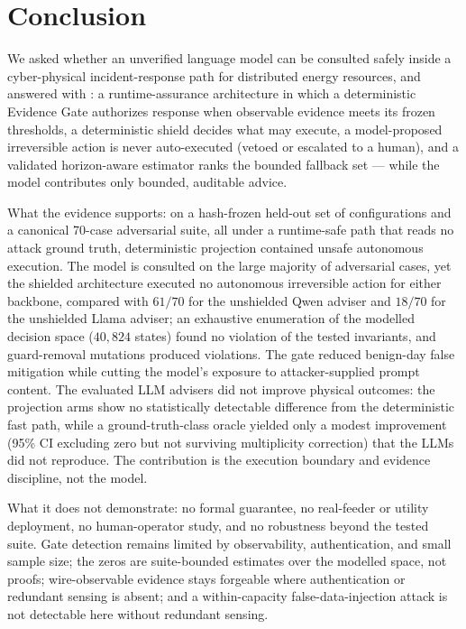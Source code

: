 \section{Conclusion}
\label{sec:conclusion}
We asked whether an unverified language model can be consulted safely
inside a cyber-physical incident-response path for distributed energy
resources, and answered with \ours: a runtime-assurance architecture in
which a deterministic Evidence Gate authorizes response when observable
evidence meets its frozen thresholds, a deterministic shield decides what may
execute, a model-proposed irreversible action is never auto-executed (vetoed
or escalated to a human), and a
validated horizon-aware estimator ranks the bounded fallback set --- while the
model contributes only bounded, auditable advice.

What the evidence supports: on a hash-frozen held-out set of configurations and a
canonical 70-case adversarial suite, all under a runtime-safe path that reads no
attack ground truth, deterministic projection contained unsafe autonomous
execution. The model is consulted on the large majority of adversarial cases, yet
the shielded architecture executed no autonomous irreversible action for either
backbone, compared with $61/70$ for the unshielded Qwen adviser and $18/70$ for
the unshielded Llama adviser; an exhaustive enumeration of the modelled decision
space ($40{,}824$ states) found no violation of the tested invariants, and
guard-removal mutations produced violations. The gate reduced benign-day false
mitigation while cutting the model's exposure to attacker-supplied prompt
content. The evaluated LLM advisers did not improve physical outcomes: the
projection arms show no statistically detectable difference from the
deterministic fast path, while a ground-truth-class oracle yielded only a modest
improvement (95\% CI excluding zero but not surviving multiplicity correction)
that the LLMs did not reproduce. The contribution is the execution boundary and
evidence discipline, not the model.

What it does not demonstrate: no formal guarantee, no real-feeder or utility
deployment, no human-operator study, and no robustness beyond the tested suite.
Gate detection remains limited by observability, authentication, and small
sample size; the zeros are suite-bounded estimates over the modelled space, not
proofs; wire-observable evidence stays forgeable where authentication or
redundant sensing is absent; and a within-capacity false-data-injection attack is
not detectable here without redundant sensing.

